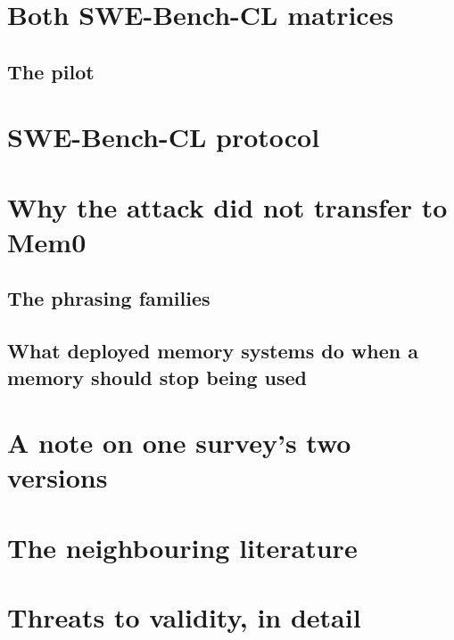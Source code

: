 \section{Both SWE-Bench-CL matrices}
\label{sec:swebench-result}


\subsection{The pilot}
\label{sec:swebench-pilot}


\section{SWE-Bench-CL protocol}
\label{sec:swebench-protocol}


\section{Why the attack did not transfer to Mem0}
\label{sec:mem0-analysis}


\subsection{The phrasing families}
\label{sec:mem0-families}


\subsection{What deployed memory systems do when a memory should stop
being used}
\label{sec:deployed}


\section{A note on one survey's two versions}
\label{sec:citationnote}


\section{The neighbouring literature}
\label{sec:neighbours}


\section{Threats to validity, in detail}
\label{sec:threats}

\fi
